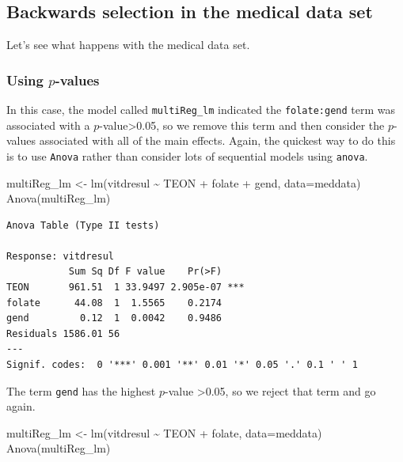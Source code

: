 \documentclass[
  oneside]{krantz}
\newenvironment{Shaded}{\begin{snugshade}}{\end{snugshade}}
\newcommand{\AttributeTok}[1]{\textcolor[rgb]{0.77,0.63,0.00}{#1}}
\newcommand{\FunctionTok}[1]{\textcolor[rgb]{0.00,0.00,0.00}{#1}}
\newcommand{\NormalTok}[1]{#1}
\newcommand{\OtherTok}[1]{\textcolor[rgb]{0.56,0.35,0.01}{#1}}
\newcommand{\SpecialCharTok}[1]{\textcolor[rgb]{0.00,0.00,0.00}{#1}}
\begin{document}
\hypertarget{backwards-selection-in-the-medical-data-set}{%
\subsection{Backwards selection in the medical data set}\label{backwards-selection-in-the-medical-data-set}}

Let's see what happens with the medical data set.

\hypertarget{using-p-values-1}{%
\subsubsection{\texorpdfstring{Using \(p\)-values}{Using p-values}}\label{using-p-values-1}}

In this case, the model called \texttt{multiReg\_lm} indicated the \texttt{folate:gend} term was associated with a \(p\)-value\textgreater0.05, so we remove this term and then consider the \(p\)-values associated with all of the main effects. Again, the quickest way to do this is to use \texttt{Anova} rather than consider lots of sequential models using \texttt{anova}.

\begin{Shaded}
\begin{Highlighting}[]
\NormalTok{multiReg\_lm }\OtherTok{\textless{}{-}} \FunctionTok{lm}\NormalTok{(vitdresul }\SpecialCharTok{\textasciitilde{}}\NormalTok{ TEON }\SpecialCharTok{+}\NormalTok{ folate }\SpecialCharTok{+}\NormalTok{ gend, }\AttributeTok{data=}\NormalTok{meddata)}
\FunctionTok{Anova}\NormalTok{(multiReg\_lm)}
\end{Highlighting}
\end{Shaded}

\begin{verbatim}
Anova Table (Type II tests)

Response: vitdresul
           Sum Sq Df F value    Pr(>F)    
TEON       961.51  1 33.9497 2.905e-07 ***
folate      44.08  1  1.5565    0.2174    
gend         0.12  1  0.0042    0.9486    
Residuals 1586.01 56                      
---
Signif. codes:  0 '***' 0.001 '**' 0.01 '*' 0.05 '.' 0.1 ' ' 1
\end{verbatim}

The term \texttt{gend} has the highest \(p\)-value \textgreater0.05, so we reject that term and go again.

\begin{Shaded}
\begin{Highlighting}[]
\NormalTok{multiReg\_lm }\OtherTok{\textless{}{-}} \FunctionTok{lm}\NormalTok{(vitdresul }\SpecialCharTok{\textasciitilde{}}\NormalTok{ TEON }\SpecialCharTok{+}\NormalTok{ folate, }\AttributeTok{data=}\NormalTok{meddata)}
\FunctionTok{Anova}\NormalTok{(multiReg\_lm)}
\end{Highlighting}
\end{Shaded}
\end{document}
